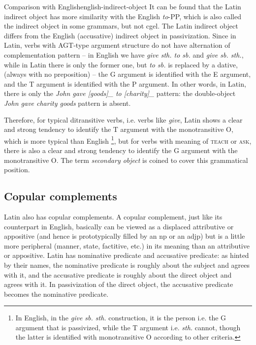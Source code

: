 \documentclass[a4paper, oneside]{report}
\newcommand*{\term}[1]{\emph{#1}}
\newcommand{\corpus}[1]{\emph{#1}}
\newcommand*{\category}[1]{\textsc{#1}}
\begin{document}
\begin{infobox}{Comparison with English}{english-indirect-object}
    It can be found that the Latin indirect object has more similarity with the English \corpus{to}-PP,
    which is also called the indirect object in some grammars, but not \ac{cgel}.
    The Latin indirect object differs from the English (accusative) indirect object in passivization.
    Since in Latin, verbs with AGT-type argument structure do not have alternation of complementation pattern
    -- in English we have \corpus{give sth. to sb.} and \corpus{give sb. sth.}, 
    while in Latin there is only the former one, but \corpus{to sb.} is replaced by a dative,
    (always with no preposition) --
    the G argument is identified with the E argument,
    and the T argument is identified with the P argument.
    In other words, in Latin, there is only 
    the \corpus{John gave [goods]_{} to [charity]_{}} pattern:
    the double-object \corpus{John gave charity goods} pattern is absent.
    
    Therefore, for typical ditransitive verbs, i.e. verbs like \corpus{give}, 
    Latin shows a clear and strong tendency to identify the T argument with the monotransitive O,
    which is more typical than English%
    \footnote{
        In English, in the \corpus{give sb. sth.} construction, it is the person i.e. the G argument that is passivized,
        while the T argument i.e. \corpus{sth.} cannot, though the latter is identified with monotransitive O
        according to other criteria. 
    },
    but for verbs with meaning of \category{teach} or \category{ask},
    there is also a clear and strong tendency to identify the G argument with the monotransitive O.
    The term \term{secondary object} is coined to cover this grammatical position.
\end{infobox}

\subsection{Copular complements}

Latin also has copular complements.
A copular complement, just like its counterpart in English,
basically can be viewed as a displaced attributive or appositive 
(and hence is prototypically filled by an \ac{np} or an \acs{adjp})
but is a little more peripheral (manner, state, factitive, etc.) 
in its meaning than an attributive or appositive.
Latin has nominative predicate and accusative predicate:
as hinted by their names, 
the nominative predicate is roughly about the subject and agrees with it,
and the accusative predicate is roughly about the direct object and agrees with it.
In passivization of the direct object,
the accusative predicate becomes the nominative predicate.
\end{document}
